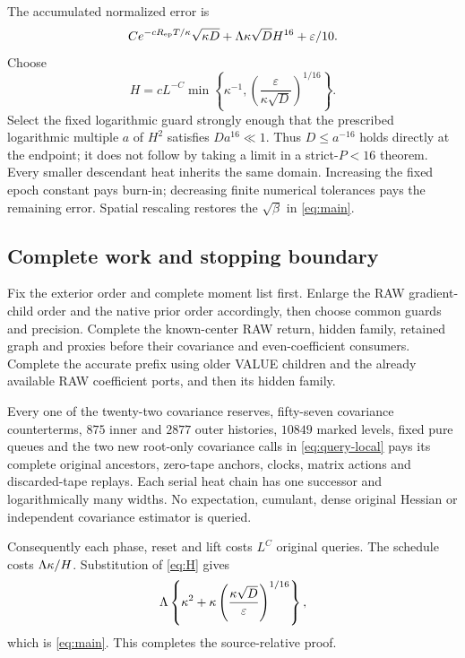 \documentclass[11pt]{article}
\numberwithin{equation}{section}
\theoremstyle{remark}\newtheorem{remark}[theorem]{Remark}
\begin{document}
The accumulated normalized error is
\begin{equation}\label{eq:global-error}
 Ce^{-cR_{\rm ep}T/\kappa}\sqrt{\kappa D}
    +\Lambda\kappa\sqrt D H^{16}+\varepsilon/10.
\end{equation}
Choose
\begin{equation}\label{eq:H}
 H=cL^{-C}\min\left\{\kappa^{-1},
             \left(\frac{\varepsilon}{\kappa\sqrt D}\right)^{1/16}\right\}.
\end{equation}
Select the fixed logarithmic guard strongly enough that the prescribed logarithmic multiple $a$ of $H^2$ satisfies $Da^{16}\ll1$. Thus $D\le a^{-16}$ holds directly at the endpoint; it does not follow by taking a limit in a strict-$P<16$ theorem. Every smaller descendant heat inherits the same domain. Increasing the fixed epoch constant pays burn-in; decreasing finite numerical tolerances pays the remaining error. Spatial rescaling restores the $\sqrt\beta$ in \eqref{eq:main}.

\subsection{Complete work and stopping boundary}
Fix the exterior order and complete moment list first. Enlarge the RAW gradient-child order and the native prior order accordingly, then choose common guards and precision. Complete the known-center RAW return, hidden family, retained graph and proxies before their covariance and even-coefficient consumers. Complete the accurate prefix using older VALUE children and the already available RAW coefficient ports, and then its hidden family.

Every one of the twenty-two covariance reserves, fifty-seven covariance counterterms, $875$ inner and $2877$ outer histories, $10849$ marked levels, fixed pure queues and the two new root-only covariance calls in \eqref{eq:query-local} pays its complete original ancestors, zero-tape anchors, clocks, matrix actions and discarded-tape replays. Each serial heat chain has one successor and logarithmically many widths. No expectation, cumulant, dense original Hessian or independent covariance estimator is queried.

Consequently each phase, reset and lift costs $L^C$ original queries. The schedule costs $\Lambda\kappa/H$. Substitution of \eqref{eq:H} gives
\[
 \Lambda\left\{\kappa^2+
 \kappa\left(\frac{\kappa\sqrt D}{\varepsilon}\right)^{1/16}\right\},
\]
which is \eqref{eq:main}. This completes the source-relative proof.
\end{document}
